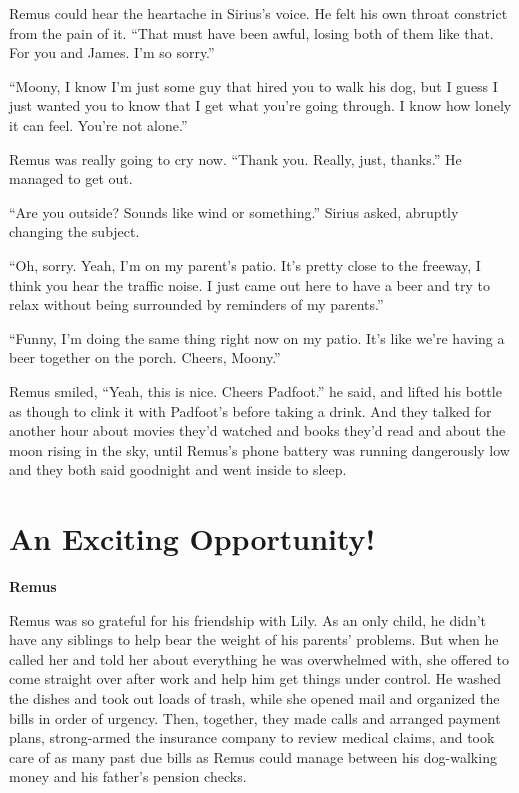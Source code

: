 \documentclass[12pt,twoside,openright]{memoir}
\begin{document}
Remus could hear the heartache in Sirius's voice. He felt his own throat constrict from the pain of it. ``That must have been awful, losing both of them like that. For you and James. I'm so sorry.''

``Moony, I know I'm just some guy that hired you to walk his dog, but I guess I just wanted you to know that I get what you're going through. I know how lonely it can feel. You're not alone.''

Remus was really going to cry now. ``Thank you. Really, just, thanks.'' He managed to get out.

``Are you outside? Sounds like wind or something.'' Sirius asked, abruptly changing the subject.

``Oh, sorry. Yeah, I'm on my parent's patio. It's pretty close to the freeway, I think you hear the traffic noise. I just came out here to have a beer and try to relax without being surrounded by reminders of my parents.''

``Funny, I'm doing the same thing right now on my patio. It's like we're having a beer together on the porch. Cheers, Moony.''

Remus smiled, ``Yeah, this is nice. Cheers Padfoot.'' he said, and lifted his bottle as though to clink it with Padfoot's before taking a drink. And they talked for another hour about movies they'd watched and books they'd read and about the moon rising in the sky, until Remus's phone battery was running dangerously low and they both said goodnight and went inside to sleep.

\chapter{An Exciting Opportunity!}

\textbf{Remus} 

Remus was so grateful for his friendship with Lily. As an only child, he didn't have any siblings to help bear the weight of his parents' problems. But when he called her and told her about everything he was overwhelmed with, she offered to come straight over after work and help him get things under control. He washed the dishes and took out loads of trash, while she opened mail and organized the bills in order of urgency. Then, together, they made calls and arranged payment plans, strong-armed the insurance company to review medical claims, and took care of as many past due bills as Remus could manage between his dog-walking money and his father's pension checks. 
\end{document}
